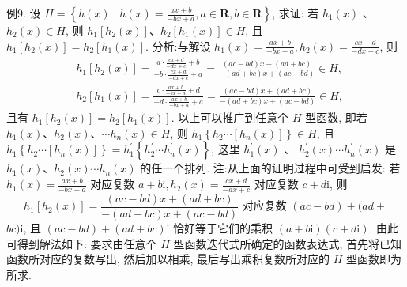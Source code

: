 例9. 设 $H=\left\{h(x) \mid h(x)=\frac{a x+b}{-b x+a}, a \in \mathbf{R}, b \in \mathbf{R}\right\}$, 求证: 若 $h_1(x)$ 、 $h_2(x) \in H$, 则 $h_1\left[h_2(x)\right] 、 h_2\left[h_1(x)\right] \in H$, 且 $h_1\left[h_2(x)\right]=h_2\left[h_1(x)\right]$.
分析:与解设 $h_1(x)=\frac{a x+b}{-b x+a}, h_2(x)=\frac{c x+d}{-d x+c}$, 则
$$
\begin{aligned}
& h_1\left[h_2(x)\right]=\frac{a \cdot \frac{c x+d}{-d x+c}+b}{-b \cdot \frac{c x+d}{-d x+c}+a}=\frac{(a c-b d) x+(a d+b c)}{-(a d+b c) x+(a c-b d)} \in H, \\
& h_2\left[h_1(x)\right]=\frac{c \cdot \frac{a x+b}{-b x+a}+d}{-d \cdot \frac{a x+b}{-b x+a}+a}=\frac{(a c-b d) x+(a d+b c)}{-(a d+b c) x+(a c-b d)} \in H,
\end{aligned}
$$
且有 $h_1\left[h_2(x)\right]=h_2\left[h_1(x)\right]$.
以上可以推广到任意个 $H$ 型函数, 即若 $h_1(x) 、 h_2(x) 、 \cdots h_n(x) \in H$, 则 $h_1\left\{h_2 \cdots\left[h_n(x)\right]\right\} \in H$, 且 $h_1\left\{h_2 \cdots\left[h_n(x)\right]\right\}=h_1^{\prime}\left\{h_2^{\prime} \cdots h_n^{\prime}(x)\right\}$, 这里 $h_1^{\prime}(x)$ 、 $h_2^{\prime}(x) \cdots h_n^{\prime}(x)$ 是 $h_1(x) 、 h_2(x) \cdots h_n(x)$ 的任一个排列.
注:从上面的证明过程中可受到启发:
若 $h_1(x)=\frac{a x+b}{-b x+a}$ 对应复数 $a+b \mathrm{i}, h_2(x)=\frac{c x+d}{-d x+c}$ 对应复数 $c+d \mathrm{i}$, 则
$$
h_1\left[h_2(x)\right]=\frac{(a c-b d) x+(a d+b c)}{-(a d+b c) x+(a c-b d)} \text { 对应复数 }(a c-b d)+(a d+
$$
$b c) \mathrm{i}$,
且 $(a c-b d)+(a d+b c) \mathrm{i}$ 恰好等于它们的乘积 $(a+b \mathrm{i})(c+d \mathrm{i})$.
由此可得到解法如下:
要求由任意个 $H$ 型函数迭代式所确定的函数表达式, 首先将已知函数所对应的复数写出, 然后加以相乘, 最后写出乘积复数所对应的 $H$ 型函数即为所求.


